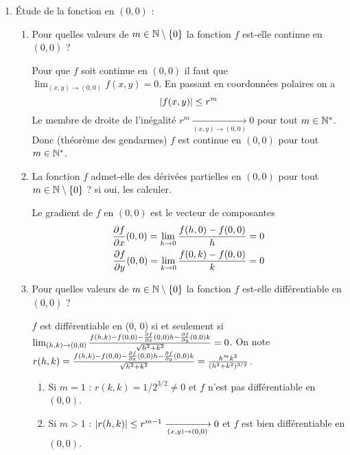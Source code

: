 \documentclass[a4paper]{article}
\begin{document}
\begin{enumerate}
\begin{enumerate}
\medskip
		\end{enumerate}
	\item  Étude de la fonction en $(0, 0)$ :
		\begin{enumerate}
			\item Pour quelles valeurs de $m\in\mathbb{N}\setminus \left\{ 0 \right\}$ la fonction $f$ est-elle continue en $(0, 0)$ ?
				
				\medskip

				Pour que $f$ soit continue en $(0, 0)$ il faut que  $\lim_{(x,y) \to (0,0)} f(x,y) = 0$. En passant en coordonnées polaires  on a 
				\[
					\left\lvert f(x,y) \right\rvert \leq r^m 
				\]
Le membre de droite de l'inégalité $r^m \xrightarrow[ (x,y) \to (0,0)]{} 0  $ pour tout $m \in \mathbb{N}^*$. Donc (théorème des gendarmes) $f$ est continue en $(0, 0)$ pour tout $m \in \mathbb{N}^* $.

			\item La fonction $f$ admet-elle des dérivées partielles en $(0, 0)$ pour tout $m\in\mathbb{N}\setminus \left\{ 0 \right\}$ ? si oui, les calculer.
				
				\medskip

Le gradient de $f$ en $(0, 0)$ est le vecteur de composantes
\begin{align*}
	\frac{\partial f}{\partial x} (0,0) =  \lim_{h\to 0} \frac{f(h,0) - f(0,0)}{h} = 0\\
\frac{\partial f}{\partial y} (0,0) =  \lim_{k\to 0} \frac{f(0,k) - f(0,0)}{k} = 0
				\end{align*}

			\item Pour quelles valeurs de $m\in\mathbb{N}\setminus \left\{ 0 \right\}$ la fonction $f$ est-elle différentiable en $(0, 0)$ ?
				
				\medskip

				$f$ est différentiable en (0, 0) si et seulement si $\lim_{(h,k) \to (0,0)} \frac{f(h,k) - f(0,0) -	\frac{\partial f}{\partial x} (0,0) h -	\frac{\partial f}{\partial y} (0,0)  k}{ \sqrt{h^2 + k^2} } = 0  $.
				On note $r(h,k) = \frac{f(h,k) - f(0,0) -	\frac{\partial f}{\partial x} (0,0) h -	\frac{\partial f}{\partial y} (0,0)  k}{ \sqrt{h^2 + k^2} } = \frac{ h^m k^2}{(h^2 + k^2)^{3/2} }$.
				\begin{enumerate}
					\item Si $m=1$ : $r(k,k) = 1/2^{3/2} \neq 0$ et $f$ n'est pas différentiable en $(0,0)$.
					\item Si $m>1$ : $\left\lvert r(h,k)\right\rvert \leq r^{m-1}\xrightarrow[ (x,y) \to (0,0)]{} 0 $ et $f$ est bien différentiable en $(0,0)$.
				\end{enumerate}
\medskip


\end{enumerate}
\end{enumerate}
\end{document}
